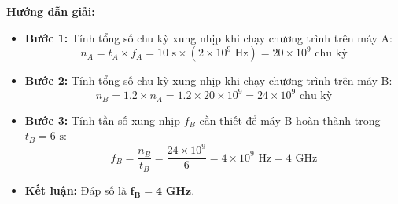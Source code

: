 \textbf{Hướng dẫn giải:}
\begin{itemize}
    \item \textbf{Bước 1:} Tính tổng số chu kỳ xung nhịp khi chạy chương trình trên máy A:
    $$n_A = t_A \times f_A = 10\text{ s} \times (2 \times 10^9\text{ Hz}) = 20 \times 10^9\text{ chu kỳ}$$
    \item \textbf{Bước 2:} Tính tổng số chu kỳ xung nhịp khi chạy chương trình trên máy B:
    $$n_B = 1.2 \times n_A = 1.2 \times 20 \times 10^9 = 24 \times 10^9\text{ chu kỳ}$$
    \item \textbf{Bước 3:} Tính tần số xung nhịp $f_B$ cần thiết để máy B hoàn thành trong $t_B = 6\text{ s}$:
    $$f_B = \frac{n_B}{t_B} = \frac{24 \times 10^9}{6} = 4 \times 10^9\text{ Hz} = 4\text{ GHz}$$
    \item \textbf{Kết luận:} Đáp số là $\mathbf{f_B = 4\text{ GHz}}$.
\end{itemize}

